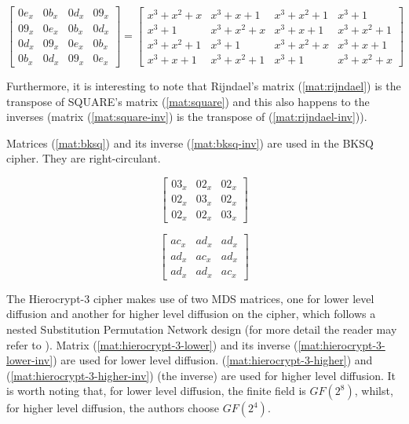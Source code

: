 \documentclass{report}
\begin{document}
\begin{equation}\label{mat:rijndael-inv}
\begin{bmatrix}
0e_x & 0b_x & 0d_x & 09_x\\
09_x & 0e_x & 0b_x & 0d_x\\
0d_x & 09_x & 0e_x & 0b_x\\
0b_x & 0d_x & 09_x & 0e_x
\end{bmatrix}
=
\begin{bmatrix}
x^3+x^2+x & x^3+x+1 & x^3+x^2+1 & x^3+1\\
x^3+1 & x^3+x^2+x & x^3+x+1 & x^3+x^2+1\\
x^3+x^2+1 & x^3+1 & x^3+x^2+x & x^3+x+1\\
x^3+x+1 & x^3+x^2+1 & x^3+1 & x^3+x^2+x
\end{bmatrix}
\end{equation}

Furthermore, it is interesting to note that Rijndael's matrix (\ref{mat:rijndael}) is the transpose of SQUARE's matrix (\ref{mat:square}) and this also happens to the inverses (matrix (\ref{mat:square-inv}) is the transpose of (\ref{mat:rijndael-inv})).

Matrices (\ref{mat:bksq}) and its inverse (\ref{mat:bksq-inv}) are used in the BKSQ \cite{BKSQ1998} cipher. They are right-circulant.

\begin{equation}\label{mat:bksq}
\begin{bmatrix}
03_x & 02_x & 02_x\\
02_x & 03_x & 02_x\\
02_x & 02_x & 03_x
\end{bmatrix}
\end{equation}

\begin{equation}\label{mat:bksq-inv}
\begin{bmatrix}
ac_x & ad_x & ad_x\\
ad_x & ac_x & ad_x\\
ad_x & ad_x & ac_x
\end{bmatrix}
\end{equation}

The Hierocrypt-3 cipher makes use of two MDS matrices, one for lower level diffusion and another for higher level diffusion on the cipher, which follows a nested Substitution Permutation Network design (for more detail the reader may refer to \cite{Hierocrypt2000}). Matrix (\ref{mat:hierocrypt-3-lower}) and its inverse (\ref{mat:hierocrypt-3-lower-inv}) are used for lower level diffusion. (\ref{mat:hierocrypt-3-higher}) and (\ref{mat:hierocrypt-3-higher-inv}) (the inverse) are used for higher level diffusion. It is worth noting that, for lower level diffusion, the finite field is $GF(2^8)$, whilst, for higher level diffusion, the authors choose $GF(2^4)$.
\end{document}
